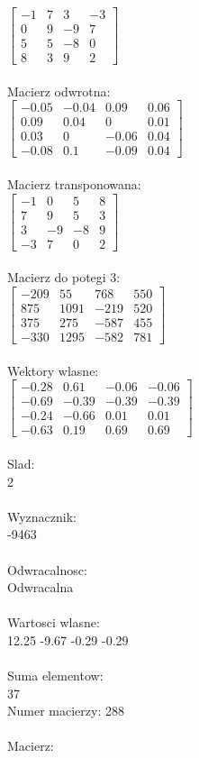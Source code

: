 \documentclass[a4paper,12pt]{article}
\begin{document}
$\begin{bmatrix} -1&7&3&-3\\0&9&-9&7\\5&5&-8&0\\8&3&9&2 \end{bmatrix}$
\\
\\
Macierz odwrotna:\\

$\begin{bmatrix} -0.05&-0.04&0.09&0.06\\0.09&0.04&0&0.01\\0.03&0&-0.06&0.04\\-0.08&0.1&-0.09&0.04 \end{bmatrix}$
\\
\\
Macierz transponowana:\\

$\begin{bmatrix} -1&0&5&8\\7&9&5&3\\3&-9&-8&9\\-3&7&0&2 \end{bmatrix}$
\\
\\
Macierz do potegi 3:\\

$\begin{bmatrix} -209&55&768&550\\875&1091&-219&520\\375&275&-587&455\\-330&1295&-582&781 \end{bmatrix}$
\\
\\
Wektory wlasne:\\

$\begin{bmatrix} -0.28&0.61&-0.06&-0.06\\-0.69&-0.39&-0.39&-0.39\\-0.24&-0.66&0.01&0.01\\-0.63&0.19&0.69&0.69 \end{bmatrix}$
\\
\\
Slad:\\
2
\\
\\
Wyznacznik:\\
-9463
\\
\\
Odwracalnosc:\\
Odwracalna
\\
\\
Wartosci wlasne:\\
12.25 -9.67 -0.29 -0.29
\\
\\
Suma elementow:\\
37
\\
\newpage
Numer macierzy:
288
\\
\\
Macierz:\\
\end{document}
